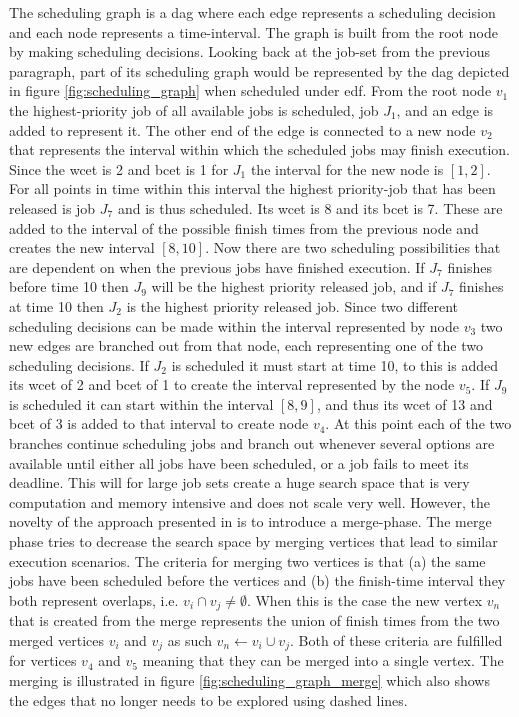 \documentclass{kththesis}
\begin{document}
The scheduling graph is a \acrfull{dag} where each edge represents a scheduling decision and each
node represents a time-interval. The graph is built from the root node by making scheduling
decisions. Looking back at the job-set from the previous paragraph, part of its scheduling graph
would be represented by the \acrshort{dag} depicted in figure \ref{fig:scheduling_graph} when
scheduled under \acrshort{edf}. From the root node $v_1$ the highest-priority job of all available
jobs is scheduled, job $J_1$, and an edge is added to represent it. The other end of the edge is
connected to a new node $v_2$ that represents the interval within which the scheduled jobs may
finish execution. Since the \acrshort{wcet} is 2 and \acrshort{bcet} is 1 for $J_1$ the interval for
the new node is $[1, 2]$. For all points in time within this interval the highest priority-job that
has been released is job $J_7$ and is thus scheduled. Its \acrshort{wcet} is 8 and its
\acrshort{bcet} is 7.  These are added to the interval of the possible finish times from the
previous node and creates the new interval $[8,10]$. Now there are two scheduling possibilities that
are dependent on when the previous jobs have finished execution. If $J_7$ finishes before time 10
then $J_9$ will be the highest priority released job, and if $J_7$ finishes at time 10 then $J_2$ is
the highest priority released job. Since two different scheduling decisions can be made within the
interval represented by node $v_3$ two new edges are branched out from that node, each representing
one of the two scheduling decisions. If $J_2$ is scheduled it must start at time 10, to this is
added its \acrshort{wcet} of 2 and \acrshort{bcet} of 1 to create the interval represented by the node
$v_5$. If $J_9$ is scheduled it can start within the interval $[8, 9]$, and thus its \acrshort{wcet}
of 13 and \acrshort{bcet} of 3 is added to that interval to create node $v_4$. At this point each of
the
two branches continue scheduling jobs and branch out whenever several options are available until
either all jobs have been scheduled, or a job fails to meet its deadline. This will for large job
sets create a huge search space that is very computation and memory intensive and does not scale
very well. However, the novelty of the approach presented in \parencite{nasri_exact_2017} is to
introduce a merge-phase. The merge phase tries to decrease the search space by merging vertices that
lead to similar execution scenarios. The criteria for merging two vertices is that (a) the same jobs
have been scheduled before the vertices and (b) the finish-time interval they both represent
overlaps, i.e. $v_i \cap v_j \neq \emptyset$.  When this is the case the new vertex $v_n$ that is
created from the merge represents the union of finish times from the two merged vertices $v_i$ and
$v_j$ as such $v_n \gets v_i \cup v_j$. Both of these criteria are fulfilled for vertices $v_4$ and
$v_5$ meaning that they can be merged into a single vertex. The merging is illustrated in figure
\ref{fig:scheduling_graph_merge} which also shows the edges that no longer needs to be explored
using dashed lines.
\end{document}
